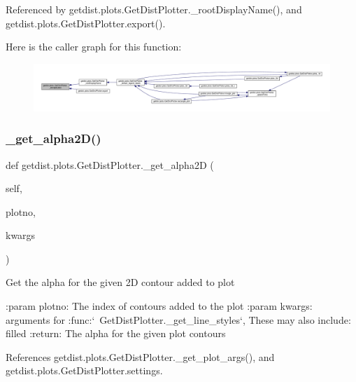Referenced by getdist.\+plots.\+Get\+Dist\+Plotter.\+\_\+root\+Display\+Name(), and getdist.\+plots.\+Get\+Dist\+Plotter.\+export().

Here is the caller graph for this function\+:
\nopagebreak
\begin{figure}[H]
\begin{center}
\leavevmode
\includegraphics[width=350pt]{classgetdist_1_1plots_1_1GetDistPlotter_a1fb43f7fb0857fd242270c3b67b30eb4_icgraph}
\end{center}
\end{figure}
\mbox{\label{classgetdist_1_1plots_1_1GetDistPlotter_a5814b23cb1d375a904161d0a7b2b78b9}} 
\subsubsection{\texorpdfstring{\+\_\+get\+\_\+alpha2\+D()}{\_get\_alpha2D()}}
{\footnotesize\ttfamily def getdist.\+plots.\+Get\+Dist\+Plotter.\+\_\+get\+\_\+alpha2D (\begin{DoxyParamCaption}\item[{}]{self,  }\item[{}]{plotno,  }\item[{}]{kwargs }\end{DoxyParamCaption})\hspace{0.3cm}{\ttfamily [private]}}

\begin{DoxyVerb}Get the alpha for the given 2D contour added to plot

:param plotno:  The index of contours added to the plot
:param kwargs: arguments for :func:`~GetDistPlotter._get_line_styles`,
    These may also include: filled
:return: The alpha for the given plot contours
\end{DoxyVerb}
 

References getdist.\+plots.\+Get\+Dist\+Plotter.\+\_\+get\+\_\+plot\+\_\+args(), and getdist.\+plots.\+Get\+Dist\+Plotter.\+settings.



